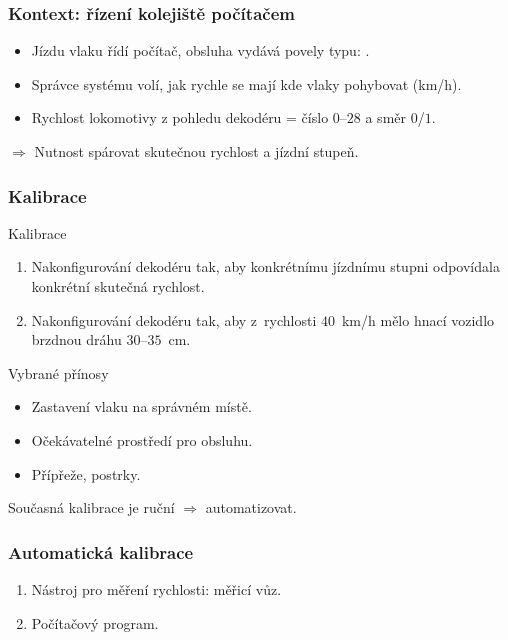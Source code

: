 \documentclass[aspectratio=169]{beamer}
\begin{document}

\begin{frame}
\frametitle{Kontext: řízení kolejiště počítačem}
\begin{itemize}
\item Jízdu vlaku řídí počítač, obsluha vydává povely typu: .
\item Správce systému volí, jak rychle se mají kde vlaky pohybovat (km/h).
\item Rychlost lokomotivy z pohledu dekodéru = číslo $0$--$28$ a směr $0$/$1$.
\end{itemize}
$\Rightarrow$ Nutnost spárovat skutečnou rychlost a jízdní stupeň.
\end{frame}


\begin{frame}
\frametitle{Kalibrace}
\begin{block}{Kalibrace}
\begin{enumerate}
\item Nakonfigurování dekodéru tak, aby konkrétnímu jízdnímu stupni odpovídala
konkrétní skutečná rychlost.
\item Nakonfigurování dekodéru tak, aby z~rychlosti $40$~km/h mělo hnací vozidlo
brzdnou dráhu $30$--$35$~cm.
\end{enumerate}
\end{block}

\pause

\begin{block}{Vybrané přínosy}
\begin{itemize}
\item Zastavení vlaku na správném místě.
\item Očekávatelné prostředí pro obsluhu.
\item Přípřeže, postrky.
\end{itemize}
\end{block}

Současná kalibrace je ruční $\Rightarrow$ automatizovat.
\end{frame}


\begin{frame}
\frametitle{Automatická kalibrace}
\begin{enumerate}
\item Nástroj pro měření rychlosti: měřicí vůz.
\item Počítačový program.
\end{enumerate}
\end{frame}
\end{document}
